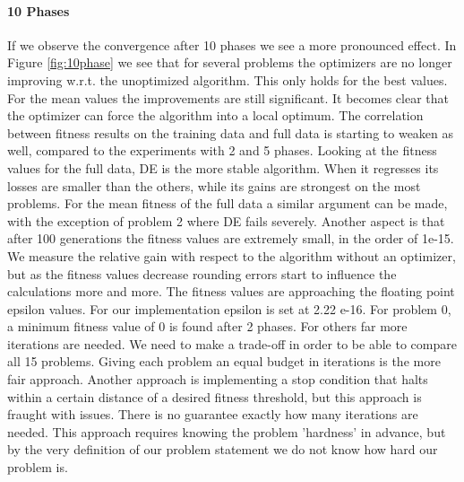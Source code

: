 \paragraph{10 Phases}
If we observe the convergence after 10 phases we see a more pronounced effect. In Figure \ref{fig:10phase} we see that for several problems the optimizers are no longer improving w.r.t. the unoptimized algorithm. This only holds for the best values. For the mean values the improvements are still significant. It becomes clear that the optimizer can force the algorithm into a local optimum. The correlation between fitness results on the training data and full data is starting to weaken as well, compared to the experiments with 2 and 5 phases. 
Looking at the fitness values for the full data, DE is the more stable algorithm. When it regresses its losses are smaller than the others, while its gains are strongest on the most problems. For the mean fitness of the full data a similar argument can be made, with the exception of problem 2 where DE fails severely.
Another aspect is that after 100 generations the fitness values are extremely small, in the order of 1e-15. We measure the relative gain with respect to the algorithm without an optimizer, but as the fitness values decrease rounding errors start to influence the calculations more and more. The fitness values are approaching the floating point epsilon values. For our implementation epsilon is set at 2.22 e-16. For problem 0, a minimum fitness value of 0 is found after 2 phases. For others far more iterations are needed. We need to make a trade-off in order to be able to compare all 15 problems. Giving each problem an equal budget in iterations is the more fair approach. Another approach is implementing a stop condition that halts within a certain distance of a desired fitness threshold, but this approach is fraught with issues. There is no guarantee exactly how many iterations are needed. This approach requires knowing the problem 'hardness' \cite{GPHardness} in advance, but by the very definition of our problem statement we do not know how hard our problem is. 